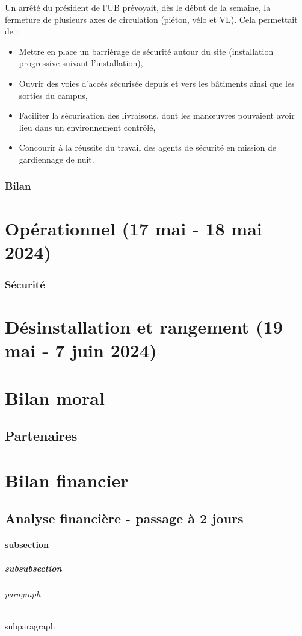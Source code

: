 \documentclass[12pt,a4paper,draft]{report}
\begin{document}
Un arrêté du président de l'UB prévoyait, dès le début de la semaine, la fermeture de plusieurs axes de circulation (piéton, vélo et VL). Cela permettait de :
\begin{itemize}
\item Mettre en place un barriérage de sécurité autour du site (installation progressive suivant l'installation),
\item Ouvrir des voies d'accès sécurisée depuis et vers les bâtiments ainsi que les sorties du campus,
\item Faciliter la sécurisation des livraisons, dont les manœuvres pouvaient avoir lieu dans un environnement contrôlé,
\item Concourir à la réussite du travail des agents de sécurité en mission de gardiennage de nuit.
\end{itemize}



\section{Bilan}

\part{Opérationnel (17 mai - 18 mai 2024)}
\section{Sécurité}


\part{Désinstallation et rangement (19 mai - 7 juin 2024)}

\part{Bilan moral}
\chapter{Partenaires}

\part{Bilan financier}
\chapter{Analyse financière - passage à 2 jours}

\subsection{subsection}
\subsubsection{subsubsection}
\paragraph{paragraph}
\subparagraph{subparagraph}
\end{document}
